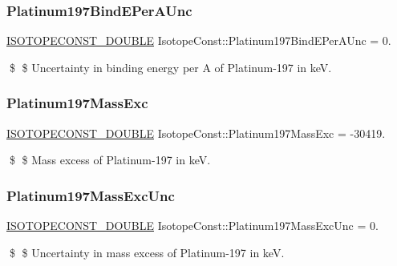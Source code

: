 \subsubsection{\texorpdfstring{Platinum197\+Bind\+E\+Per\+A\+Unc}{Platinum197BindEPerAUnc}}
{\footnotesize\ttfamily \mbox{\hyperlink{group___isotope_const-_macros_ga8f45a7272ce02c0b4c65c44636ed719a}{I\+S\+O\+T\+O\+P\+E\+C\+O\+N\+S\+T\+\_\+\+D\+O\+U\+B\+LE}} Isotope\+Const\+::\+Platinum197\+Bind\+E\+Per\+A\+Unc = 0.}

\$ \$ Uncertainty in binding energy per A of Platinum-\/197 in keV. \mbox{\label{group___isotope_const-_platinum-_pt197_gabf6bb50d0c38ccd8b6951336a7babbfc}} 
\subsubsection{\texorpdfstring{Platinum197\+Mass\+Exc}{Platinum197MassExc}}
{\footnotesize\ttfamily \mbox{\hyperlink{group___isotope_const-_macros_ga8f45a7272ce02c0b4c65c44636ed719a}{I\+S\+O\+T\+O\+P\+E\+C\+O\+N\+S\+T\+\_\+\+D\+O\+U\+B\+LE}} Isotope\+Const\+::\+Platinum197\+Mass\+Exc = -\/30419.}

\$ \$ Mass excess of Platinum-\/197 in keV. \mbox{\label{group___isotope_const-_platinum-_pt197_ga9bf89d46e8f1bc086bb91ffa586fcb9d}} 
\subsubsection{\texorpdfstring{Platinum197\+Mass\+Exc\+Unc}{Platinum197MassExcUnc}}
{\footnotesize\ttfamily \mbox{\hyperlink{group___isotope_const-_macros_ga8f45a7272ce02c0b4c65c44636ed719a}{I\+S\+O\+T\+O\+P\+E\+C\+O\+N\+S\+T\+\_\+\+D\+O\+U\+B\+LE}} Isotope\+Const\+::\+Platinum197\+Mass\+Exc\+Unc = 0.}

\$ \$ Uncertainty in mass excess of Platinum-\/197 in keV. \mbox{\label{group___isotope_const-_platinum-_pt197_ga2d25b5518d9ecf786ec58cda41361e8d}} 
